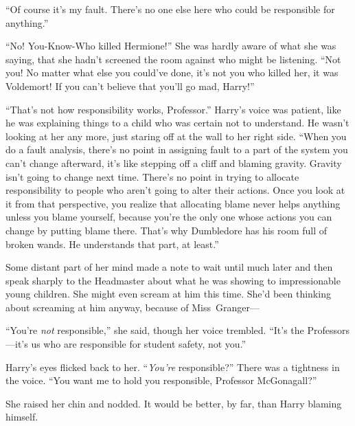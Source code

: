 “Of course it’s my fault. There’s no one else here who could be responsible for anything.”

“No! You-Know-Who killed Hermione!” She was hardly aware of what she was saying, that she hadn’t screened the room against who might be listening. “Not you! No matter what else you could’ve done, it’s not you who killed her, it was Voldemort! If you can’t believe that you’ll go mad, Harry!”

“That’s not how responsibility works, Professor.” Harry’s voice was patient, like he was explaining things to a child who was certain not to understand. He wasn’t looking at her any more, just staring off at the wall to her right side. “When you do a fault analysis, there’s no point in assigning fault to a part of the system you can’t change afterward, it’s like stepping off a cliff and blaming gravity. Gravity isn’t going to change next time. There’s no point in trying to allocate responsibility to people who aren’t going to alter their actions. Once you look at it from that perspective, you realize that allocating blame never helps anything unless you blame yourself, because you’re the only one whose actions you can change by putting blame there. That’s why Dumbledore has his room full of broken wands. He understands that part, at least.”

Some distant part of her mind made a note to wait until much later and then speak sharply to the Headmaster about what he was showing to impressionable young children. She might even scream at him this time. She’d been thinking about screaming at him anyway, because of Miss~Granger—

“You’re \emph{not} responsible,” she said, though her voice trembled. “It’s the Professors—it’s us who are responsible for student safety, not you.”

Harry’s eyes flicked back to her. “\emph{You’re} responsible?” There was a tightness in the voice. “You want me to hold you responsible, Professor McGonagall?”

She raised her chin and nodded. It would be better, by far, than Harry blaming himself.

